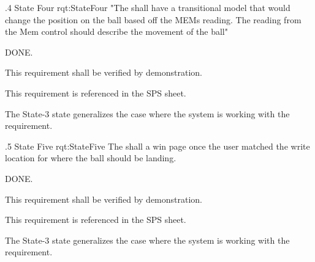 \ONERQMTV
{\RqtNumberBase.4}
{State Four}
{rqt:StateFour}
{"The \ThisSys shall have a transitional model that would change the position on the ball based off the MEMs reading. The reading from the Mem control should describe the movement of the ball"}
{
	\item [Phase 1] DONE.
}
{This requirement shall be verified by demonstration.}
{
	\item [SPS] This requirement is referenced in the SPS sheet.
}
{
	\item The State-3 state generalizes the case where the system is working with the requirement.
}


\ONERQMTV
{\RqtNumberBase.5}
{State Five}
{rqt:StateFive}
{The \ThisSys shall a win page once the user matched the write location for where the ball should be landing.}
{
	\item [Phase 1] DONE.

}
{This requirement shall be verified by demonstration.}
{
	\item [SPS] This requirement is referenced in the SPS sheet.
}
{
	\item The State-3 state generalizes the case where the system is working with the requirement.
}


